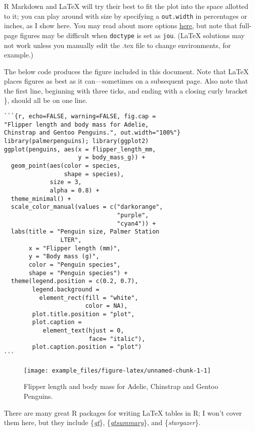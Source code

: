 \documentclass[jou]{apa7}
\begin{document}
R Markdown and LaTeX will try their best to fit the plot into the space
allotted to it; you can play around with size by specifying a
\texttt{out.width} in percentages or inches, as I show here. You may
read about more options
\href{https://bookdown.org/yihui/rmarkdown/pdf-document.html\#figure-options-1}{here},
but note that full-page figures may be difficult when \texttt{doctype}
is set as \texttt{jou}. (LaTeX solutions may not work unless you
manually edit the .tex file to change environments, for example.)

The below code produces the figure included in this document. Note that
LaTeX places figures as best as it can---sometimes on a subsequent page.
Also note that the first line, beginning with three ticks, and ending
with a closing curly bracket \}, should all be on one line.

\begin{verbatim}
```{r, echo=FALSE, warning=FALSE, fig.cap = 
"Flipper length and body mass for Adelie, 
Chinstrap and Gentoo Penguins.", out.width="100%"}
library(palmerpenguins); library(ggplot2)
ggplot(penguins, aes(x = flipper_length_mm, 
                     y = body_mass_g)) +
  geom_point(aes(color = species, 
                 shape = species),
             size = 3,
             alpha = 0.8) +
  theme_minimal() +
  scale_color_manual(values = c("darkorange",
                                "purple",
                                "cyan4")) +
  labs(title = "Penguin size, Palmer Station
                LTER",
       x = "Flipper length (mm)",
       y = "Body mass (g)",
       color = "Penguin species",
       shape = "Penguin species") +
  theme(legend.position = c(0.2, 0.7),
        legend.background = 
          element_rect(fill = "white",
                       color = NA),
        plot.title.position = "plot",
        plot.caption = 
           element_text(hjust = 0, 
                        face= "italic"),
        plot.caption.position = "plot")
```
\end{verbatim}

\begin{figure}
\texttt{[image: example\_files/figure-latex/unnamed-chunk-1-1]} \caption{Flipper length and body mass for Adelie, Chinstrap and Gentoo Penguins.}\label{fig:unnamed-chunk-1}
\end{figure}

There are many great R packages for writing LaTeX tables in R; I won't
cover them here, but they include
\{\emph{\href{https://gt.rstudio.com/index.html}{gt}}\},
\{\emph{\href{https://www.danieldsjoberg.com/gtsummary/}{gtsummary}}\},
and \{\emph{stargazer}\}.
\end{document}
